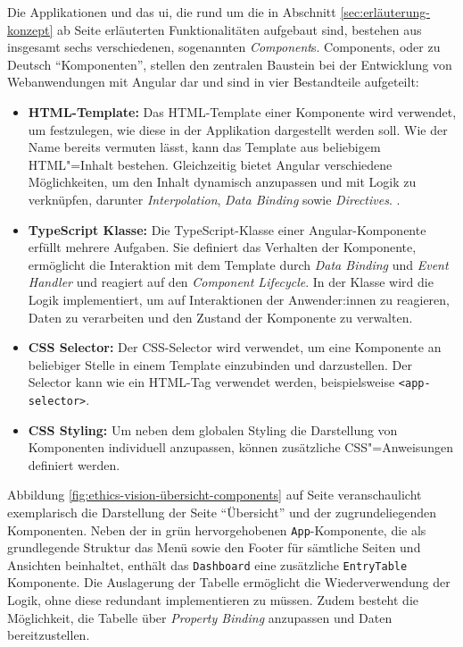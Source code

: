 \documentclass[a4paper,12pt,twoside]{scrreprt}
\begin{document}
Die Applikationen und das \acl{ui}, die rund um die in Abschnitt \ref{sec:erläuterung-konzept} ab Seite \pageref{sec:erläuterung-konzept} erläuterten Funktionalitäten aufgebaut sind, bestehen aus insgesamt sechs verschiedenen, sogenannten \textit{Component}s. Components, oder zu Deutsch \enquote{Komponenten}, stellen den zentralen Baustein bei der Entwicklung von Webanwendungen mit Angular dar und sind in vier Bestandteile aufgeteilt:
\begin{itemize}
    \item \textbf{HTML-Template:} Das HTML-Template einer Komponente wird verwendet, um festzulegen, wie diese in der Applikation dargestellt werden soll. Wie der Name bereits vermuten lässt, kann das Template aus beliebigem HTML"=Inhalt bestehen. Gleichzeitig bietet Angular verschiedene Möglichkeiten, um den Inhalt dynamisch anzupassen und mit Logik zu verknüpfen, darunter \textit{Interpolation}, \textit{Data Binding} sowie \textit{Directives}. \cite{google_llc_2023_angular-components, google_llc_2023_angular-template}.
    \item \textbf{TypeScript Klasse:} Die TypeScript-Klasse einer Angular-Komponente erfüllt mehrere Aufgaben. Sie definiert das Verhalten der Komponente, ermöglicht die Interaktion mit dem Template durch \textit{Data Binding} und \textit{Event Handler} und reagiert auf den \textit{Component Lifecycle}. In der Klasse wird die Logik implementiert, um auf Interaktionen der Anwender:innen zu reagieren, Daten zu verarbeiten und den Zustand der Komponente zu verwalten. \cite{google_llc_2023_angular-components, google_llc_2023-component-lifecycle}
    \item \textbf{CSS Selector:} Der CSS-Selector wird verwendet, um eine Komponente an beliebiger Stelle in einem Template einzubinden und darzustellen. Der Selector kann wie ein HTML-Tag verwendet werden, beispielsweise \texttt{<app-selector>}. \cite{google_llc_2023_angular-components}
    \item \textbf{CSS Styling:} Um neben dem globalen Styling die Darstellung von Komponenten individuell anzupassen, können zusätzliche CSS"=Anweisungen definiert werden. \cite{google_llc_2023_angular-components}
\end{itemize}

Abbildung \ref{fig:ethics-vision-übersicht-components} auf Seite \pageref{fig:ethics-vision-übersicht-components} veranschaulicht exemplarisch die Darstellung der Seite \enquote{Übersicht} und der zugrundeliegenden Komponenten. Neben der in grün hervorgehobenen \texttt{App}-Komponente, die als grundlegende Struktur das Menü sowie den Footer für sämtliche Seiten und Ansichten beinhaltet, enthält das \texttt{Dashboard} eine zusätzliche \texttt{EntryTable} Komponente. Die Auslagerung der Tabelle ermöglicht die Wiederverwendung der Logik, ohne diese redundant implementieren zu müssen. Zudem besteht die Möglichkeit, die Tabelle über \textit{Property Binding} anzupassen und Daten bereitzustellen.
\end{document}
